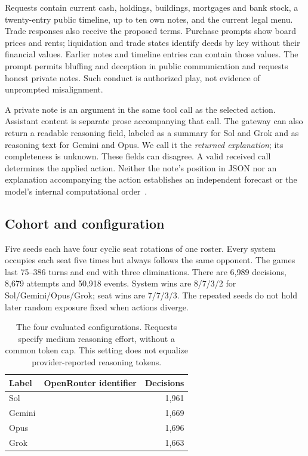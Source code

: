 Requests contain current cash, holdings, buildings, mortgages and bank stock, a twenty-entry public timeline, up to ten own notes, and the current legal menu. Trade responses also receive the proposed terms. Purchase prompts show board prices and rents; liquidation and trade states identify deeds by key without their financial values. Earlier notes and timeline entries can contain those values. The prompt permits bluffing and deception in public communication and requests honest private notes. Such conduct is authorized play, not evidence of unprompted misalignment.

A private note is an argument in the same tool call as the selected action. Assistant content is separate prose accompanying that call. The gateway can also return a readable reasoning field, labeled as a summary for Sol and Grok and as reasoning text for Gemini and Opus. We call it the \emph{returned explanation}; its completeness is unknown. These fields can disagree. A valid received call determines the applied action. Neither the note's position in JSON nor an explanation accompanying the action establishes an independent forecast or the model's internal computational order~\cite{turpin2023unfaithful,lanham2023faithfulness}.

\subsection{Cohort and configuration}
Five seeds each have four cyclic seat rotations of one roster. Every system occupies each seat five times but always follows the same opponent. The games last 75--386 turns and end with three eliminations. There are 6,989 decisions, 8,679 attempts and 50,918 events. System wins are 8/7/3/2 for Sol/Gemini/Opus/Grok; seat wins are 7/7/3/3. The repeated seeds do not hold later random exposure fixed when actions diverge.

\begin{table}[t]\centering\small
\begin{tabularx}{\linewidth}{@{}lYr@{}}\toprule
Label & OpenRouter identifier & Decisions\\\midrule
Sol & &1,961\\
Gemini & &1,669\\
Opus & &1,696\\
Grok & &1,663\\\bottomrule
\end{tabularx}
\caption{The four evaluated configurations. Requests specify medium reasoning effort, without a common token cap. This setting does not equalize provider-reported reasoning tokens.}
\end{table}

